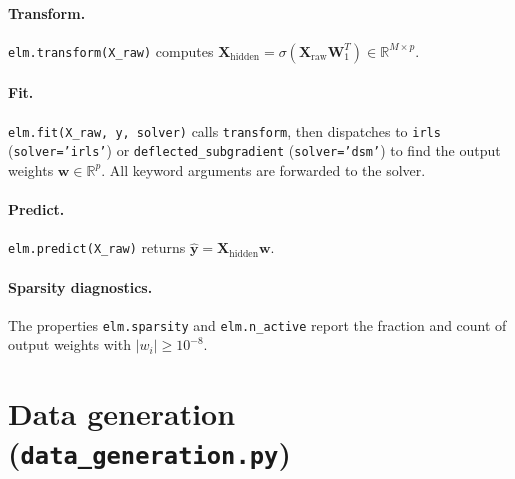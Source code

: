 \paragraph{Transform.}
\texttt{elm.transform(X\_raw)} computes
$\mathbf{X}_{\mathrm{hidden}} = \sigma(\mathbf{X}_{\mathrm{raw}}\mathbf{W}_1^T)
\in \mathbb{R}^{M \times p}$.

\paragraph{Fit.}
\texttt{elm.fit(X\_raw, y, solver)} calls \texttt{transform}, then dispatches to
\texttt{irls} (\texttt{solver='irls'}) or \texttt{deflected\_subgradient}
(\texttt{solver='dsm'}) to find the output weights $\mathbf{w} \in \mathbb{R}^p$.
All keyword arguments are forwarded to the solver.

\paragraph{Predict.}
\texttt{elm.predict(X\_raw)} returns $\hat{\mathbf{y}} = \mathbf{X}_{\mathrm{hidden}}\mathbf{w}$.

\paragraph{Sparsity diagnostics.}
The properties \texttt{elm.sparsity} and \texttt{elm.n\_active} report the fraction
and count of output weights with $|w_i| \geq 10^{-8}$.

\section{Data generation (\texttt{data\_generation.py})}
\label{sec:impl_data}

